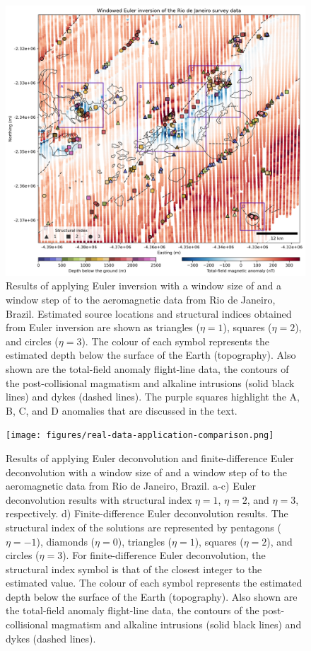 \begin{figure}[tb!]
\centering
\includegraphics[width=1\linewidth]{figures/real-data-application.png}
\caption{
    Results of applying Euler inversion with a window size of \RioWindowSize{} and a window step of \RioWindowStep{} to the aeromagnetic data from Rio de Janeiro, Brazil.
    Estimated source locations and structural indices obtained from Euler inversion are shown as triangles ($\eta=1$), squares ($\eta=2$), and circles ($\eta=3$).
    The colour of each symbol represents the estimated depth below the surface of the Earth (topography).
    Also shown are the total-field anomaly flight-line data, the contours of the post-collisional magmatism and alkaline intrusions (solid black lines) and dykes (dashed lines).
    The purple squares highlight the A, B, C, and D anomalies that are discussed in the text.
}
\label{fig:rio_results}
\end{figure}

\begin{figure}[tb!]
\centering
\texttt{[image: figures/real-data-application-comparison.png]}
\caption{
    Results of applying Euler deconvolution and finite-difference Euler
    deconvolution with a window size of \RioWindowSize{} and a window step of
    \RioWindowStep{} to the aeromagnetic data from Rio de Janeiro, Brazil.
    a-c) Euler deconvolution results with structural index $\eta=1$, $\eta=2$,
    and $\eta=3$, respectively.
    d) Finite-difference Euler deconvolution results.
    The structural index of the solutions are represented by pentagons
    ($\eta=-1$),  diamonds ($\eta=0$),  triangles ($\eta=1$),  squares
    ($\eta=2$), and circles ($\eta=3$).
    For finite-difference Euler deconvolution, the structural index symbol is
    that of the closest integer to the estimated value.
    The colour of each symbol represents the estimated depth below the surface
    of the Earth (topography).
    Also shown are the total-field anomaly flight-line data, the contours of
    the post-collisional magmatism and alkaline intrusions (solid black lines)
    and dykes (dashed lines).
}
\label{fig:rio_comp}
\end{figure}

